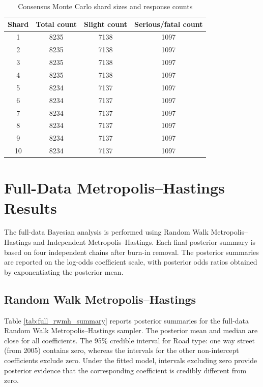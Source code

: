 \begin{table}[htbp]
\centering
\caption{Consensus Monte Carlo shard sizes and response counts}
\label{tab:cmc_shard_response}
\begin{tabular}{cccc}
\hline
Shard & Total count & Slight count & Serious/fatal count \\
\hline
1 & 8235 & 7138 & 1097 \\
2 & 8235 & 7138 & 1097 \\
3 & 8235 & 7138 & 1097 \\
4 & 8235 & 7138 & 1097 \\
5 & 8234 & 7137 & 1097 \\
6 & 8234 & 7137 & 1097 \\
7 & 8234 & 7137 & 1097 \\
8 & 8234 & 7137 & 1097 \\
9 & 8234 & 7137 & 1097 \\
10 & 8234 & 7137 & 1097 \\
\hline
\end{tabular}
\end{table}

\section{Full-Data Metropolis--Hastings Results}

The full-data Bayesian analysis is performed using Random Walk Metropolis--Hastings and Independent Metropolis--Hastings. Each final posterior summary is based on four independent chains after burn-in removal. The posterior summaries are reported on the log-odds coefficient scale, with posterior odds ratios obtained by exponentiating the posterior mean.

\subsection{Random Walk Metropolis--Hastings}

Table \ref{tab:full_rwmh_summary} reports posterior summaries for the full-data Random Walk Metropolis--Hastings sampler. The posterior mean and median are close for all coefficients. The 95\% credible interval for Road type: one way street (from 2005) contains zero, whereas the intervals for the other non-intercept coefficients exclude zero. Under the fitted model, intervals excluding zero provide posterior evidence that the corresponding coefficient is credibly different from zero.

